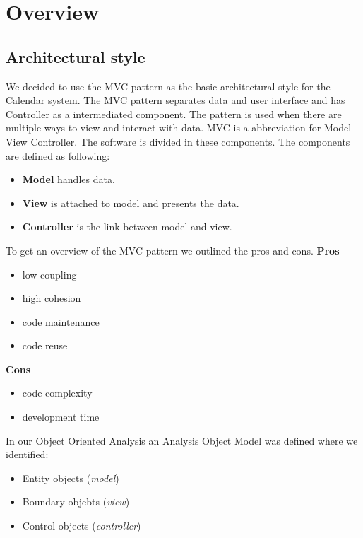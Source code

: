 \section{Overview}

\subsection{Architectural style}
\mbox{}\newline
 We decided to use the MVC pattern as the basic architectural style for the Calendar system.
\newline
\newline
The MVC pattern separates data and user interface and has Controller as a intermediated component. The pattern is used when there are multiple ways to view and interact with data.
\newline
\newline
MVC is a abbreviation for Model View Controller. The software is divided in these components. The components are defined as following:
\begin{itemize}
	\item \textbf{Model} handles data.
	\item \textbf{View} is attached to model and presents the data.
	\item \textbf{Controller} is the link between model and view. 
\end{itemize}
\bigskip


To get an overview of the MVC pattern we outlined the pros and cons.
\newline
\textbf{Pros}
\begin{itemize}
	\item low coupling
	\item high cohesion
	\item code maintenance
	\item code reuse
\end{itemize}
\textbf{Cons}
\begin{itemize}
	\item code complexity
	\item development time
\end{itemize}

\newpage
In our Object Oriented Analysis an Analysis Object Model was defined where we identified:
\begin{itemize}
	\item Entity objects (\emph{model})
	\item Boundary objebts (\emph{view})
	\item Control objects (\emph{controller})
\end{itemize}

